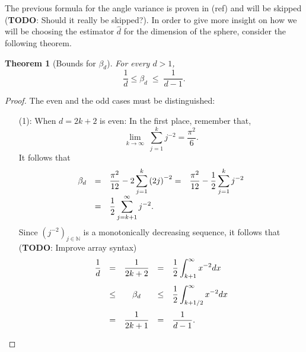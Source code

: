 \documentclass[12pt]{exam}
\def\N{\ensuremath{\mathbb{N}}}
\newtheorem{theorem}{Theorem}[section]
\theoremstyle{remark}
\begin{document}
The previous formula for the angle variance is proven in (ref) and will be skipped (\textbf{TODO}: Should it really be skipped?). In order to give more insight on how we will be choosing the estimator $\widehat{d}$ for the dimension of the sphere, consider the following theorem.

\begin{theorem}[Bounds for $\beta_d$]\label{ade:T1}
  For every $d > 1$,
  \[ \frac{1}{d} \leq \beta_d \;\leq\; \frac{1}{d-1}. \] 
\end{theorem}

\begin{proof}
  The even and the odd cases must be distinguished:
  \begin{enumerate}
    \item[(1):] When $d = 2k+2$ is even:
    In the first place, remember that,
    \[ \lim_{k\to\infty}\; \sum_{j = 1}^{k} j^{-2} = \frac{\pi^2}{6}.\] 
    It follows that
    \[\everymath{\displaystyle}
      \begin{array}{rrlll}
        \beta_d & = & \frac{\pi^2}{12} - 2 \sum_{j = 1}^{k} {(2j)}^{-2}= & \frac{\pi^2}{12} - \frac{1}{2} \sum_{j = 1}^{k} j^{-2}\\
        & = & \frac{1}{2} \sum_{j = k+1}^{\infty} j^{-2}.
      \end{array}      
     \]
    Since ${(j^{-2})}_{j \in \N}$ is a monotonically decreasing sequence, it follows that (\textbf{TODO}: Improve array syntax)
    \[\everymath{\displaystyle} 
      \begin{array}{rrcll}
        \frac{1}{d}   & = & \frac{1}{2k+2}  & = & \frac{1}{2} \int_{k+1}^{\infty}x^{-2} dx\\[5mm]
      & \leq & \beta_d  & \leq & \frac{1}{2} \int_{k+1/2}^{\infty}x^{-2} dx\\[5mm]
      & = & \frac{1}{2k+1} & = & \frac{1}{d-1}.
    \end{array}  \] 


\end{enumerate}
\end{proof}
\end{document}
